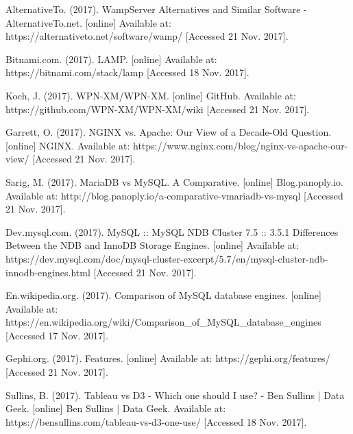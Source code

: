 \documentclass[letterpaper,10pt,titlepage]{article}
\begin{document}
\begin{thebibliography}{9}

AlternativeTo. (2017). WampServer Alternatives and Similar Software - AlternativeTo.net. [online] Available at: https://alternativeto.net/software/wamp/ [Accessed 21 Nov. 2017].

Bitnami.com. (2017). LAMP. [online] Available at: https://bitnami.com/stack/lamp [Accessed 18 Nov. 2017].

Koch, J. (2017). WPN-XM/WPN-XM. [online] GitHub. Available at: https://github.com/WPN-XM/WPN-XM/wiki [Accessed 21 Nov. 2017].

Garrett, O. (2017). NGINX vs. Apache: Our View of a Decade-Old Question. [online] NGINX. Available at: https://www.nginx.com/blog/nginx-vs-apache-our-view/ [Accessed 21 Nov. 2017].

Sarig, M. (2017). MariaDB vs MySQL. A Comparative. [online] Blog.panoply.io. Available at: http://blog.panoply.io/a-comparative-vmariadb-vs-mysql [Accessed 21 Nov. 2017].

 Dev.mysql.com. (2017). MySQL :: MySQL NDB Cluster 7.5 :: 3.5.1 Differences Between the NDB and InnoDB Storage Engines. [online] Available at: https://dev.mysql.com/doc/mysql-cluster-excerpt/5.7/en/mysql-cluster-ndb-innodb-engines.html [Accessed 21 Nov. 2017].

En.wikipedia.org. (2017). Comparison of MySQL database engines. [online] Available at: https://en.wikipedia.org/wiki/Comparison\_of\_MySQL\_database\_engines [Accessed 17 Nov. 2017].

Gephi.org. (2017). Features. [online] Available at: https://gephi.org/features/ [Accessed 21 Nov. 2017].

Sullins, B. (2017). Tableau vs D3 - Which one should I use? - Ben Sullins | Data Geek. [online] Ben Sullins | Data Geek. Available at: https://bensullins.com/tableau-vs-d3-one-use/ [Accessed 18 Nov. 2017].

\end{thebibliography}
\end{document}
